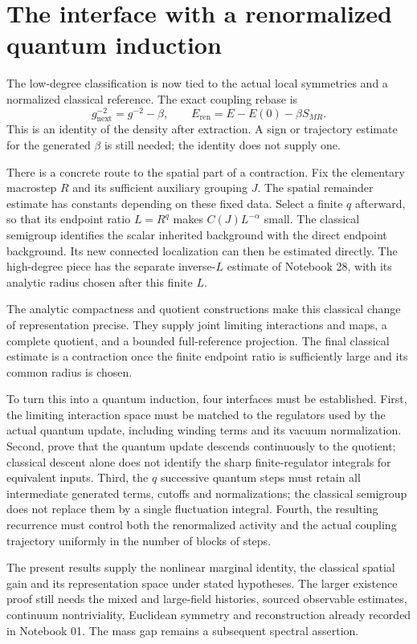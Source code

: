 \documentclass[11pt]{article}
\theoremstyle{remark}
\begin{document}
\section{The interface with a renormalized quantum induction}
\label{gex-next-section}

The low-degree classification is now tied to the actual local
symmetries and a normalized classical reference. The exact
coupling rebase is
\[
 g_{\mathrm{next}}^{-2}=g^{-2}-\beta,\qquad
 E_{\mathrm{ren}}=E-E(0)-\beta S_{MR}.
\]
This is an identity of the density after extraction. A sign
or trajectory estimate for the generated \(\beta\) is still
needed; the identity does not supply one.

There is a concrete route to the spatial part of a contraction.
Fix the elementary macrostep \(R\) and its sufficient auxiliary
grouping \(J\). The spatial remainder estimate has constants
depending on these fixed data. Select a finite \(q\) afterward,
so that its endpoint ratio \(L=R^q\) makes
\(C(J)L^{-\alpha}\) small. The classical semigroup identifies
the scalar inherited background with the direct endpoint
background. Its new connected localization can then be
estimated directly. The high-degree piece has the separate
inverse-\(L\) estimate of Notebook 28, with its analytic radius
chosen after this finite \(L\).

The analytic compactness and quotient constructions make
this classical change of representation precise. They supply
joint limiting interactions and maps, a complete quotient,
and a bounded full-reference projection. The final classical
estimate is a contraction once the finite endpoint ratio
is sufficiently large and its common radius is chosen.

To turn this into a quantum induction, four interfaces must
be established. First, the limiting interaction space must
be matched to the regulators used by the actual quantum update,
including winding terms and its vacuum normalization.
Second, prove that the quantum update descends continuously
to the quotient; classical descent alone does not identify
the sharp finite-regulator integrals for equivalent inputs.
Third, the \(q\) successive
quantum steps must retain all intermediate generated terms,
cutoffs and normalizations; the classical semigroup does not
replace them by a single fluctuation integral. Fourth, the
resulting recurrence must control both the renormalized
activity and the actual coupling trajectory uniformly in
the number of blocks of steps.

The present results supply the nonlinear marginal identity,
the classical spatial gain and its representation space
under stated hypotheses. The larger existence proof
still needs the mixed and large-field histories, sourced
observable estimates, continuum nontriviality, Euclidean
symmetry and reconstruction already recorded in Notebook 01.
The mass gap remains a subsequent spectral assertion.
\end{document}
